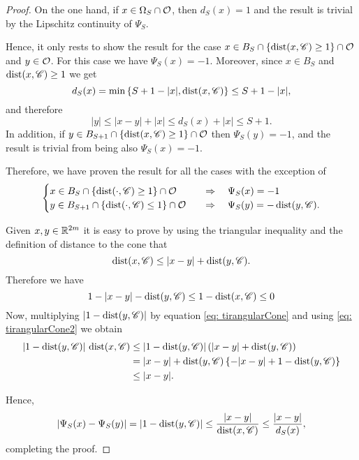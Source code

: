 \begin{proof}
On the one hand, if $x\in \Omega_S \cap \mathcal{O}$, then $d_S(x)=1$ and the result is trivial by the Lipschitz continuity of $\Psi_S$.

Hence, it only rests to show the result for the case $x\in B_S\cap \{\operatorname{dist}(x,\mathscr{C})\geq 1\} \cap \mathcal{O}$ and $y\in \mathcal{O}$. For this case we have $\Psi_S(x)=-1$. Moreover, since $x\in B_S$ and $\operatorname{dist}(x,\mathscr{C})\geq 1$ we get
$$ d_S(x) = \min\left\{S+1-|x|,\operatorname{dist}(x,\mathscr{C})\right\} \leq S+1-|x|,$$
and therefore
$$ |y|\leq |x-y| + |x| \leq d_S(x)+|x| \leq S+1. $$
In addition, if $y\in B_{S+1} \cap \{\operatorname{dist}(x,\mathscr{C})\geq 1\}\cap \mathcal{O}$ then $\Psi_S(y)=-1$, and the
result is trivial from being also $\Psi_S(x)=-1$.

Therefore, we have proven the result for all the cases with the exception of
$$\begin{cases}
x\in B_S \cap \{\operatorname{dist}(\cdot,\mathscr{C})\geq 1\}\cap \mathcal{O} \ \ \ &\Rightarrow \ \ \ \Psi_S(x)=-1 \\
y\in B_{S+1} \cap \{\operatorname{dist}(\cdot,\mathscr{C})\leq 1\}\cap \mathcal{O} \ \ \ &\Rightarrow \ \ \ \Psi_S(y)=-\operatorname{dist}(y,\mathscr{C}). \\
\end{cases}$$

Given $x,y \in \mathbb{R}^{2m}$ it is easy to prove by using the triangular inequality and the definition of distance to the cone that
\begin{equation} \label{eq: tirangularCone}
\operatorname{dist}(x,\mathscr{C}) \leq |x-y| + \operatorname{dist}(y,\mathscr{C}).
\end{equation}
Therefore we have
\begin{equation} \label{eq: tirangularCone2}
1-|x-y|-\operatorname{dist}(y,\mathscr{C}) \leq 1-\operatorname{dist}(x,\mathscr{C}) \leq 0
\end{equation}
Now, multiplying $|1-\operatorname{dist}(y,\mathscr{C})|$ by equation \eqref{eq: tirangularCone} and using \eqref{eq: tirangularCone2} we obtain
\begin{align*}
|1-\operatorname{dist}(y,\mathscr{C})|\,\operatorname{dist}(x,\mathscr{C}) &\leq |1-\operatorname{dist}(y,\mathscr{C})| \left(|x-y| + \operatorname{dist}(y,\mathscr{C})\right) \\
&= |x-y|+\operatorname{dist}(y,\mathscr{C}) \left\{ -|x-y|+ 1- \operatorname{dist}(y,\mathscr{C}) \right\} \\
&\leq |x-y|.
\end{align*}

Hence,
$$ |\Psi_S(x)-\Psi_S(y)| = |1-\operatorname{dist}(y,\mathscr{C})| \leq \frac{|x-y|}{\operatorname{dist}(x,\mathscr{C})} \leq  \frac{|x-y|}{d_S(x)},$$
completing the proof.
\end{proof}

